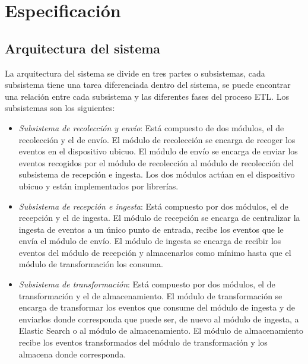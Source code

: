 \chapter{Especificación}

\section{Arquitectura del sistema}
La arquitectura del sistema se divide en tres partes o subsistemas, cada subsistema tiene una tarea diferenciada dentro del sistema, se puede encontrar una relación entre cada subsistema y las diferentes fases del proceso ETL. Los subsistemas son los siguientes:

\begin{itemize}
	\item \textit{Subsistema de recolección y envío}: Está compuesto de dos módulos, el de recolección y el de envío. El módulo de recolección se encarga de recoger los eventos en el dispositivo ubicuo. El módulo de envío se encarga de enviar los eventos recogidos por el módulo de recolección al módulo de recolección del subsistema de recepción e ingesta. Los dos módulos actúan en el dispositivo ubicuo y están implementados por librerías.
	
	\item \textit{Subsistema de recepción e ingesta}: Está compuesto por dos módulos, el de recepción y el de ingesta. El módulo de recepción se encarga de centralizar la ingesta de eventos a un único punto de entrada, recibe los eventos que le envía el módulo de envío. El módulo de ingesta se encarga de recibir los eventos del módulo de recepción y almacenarlos como mínimo hasta que el módulo de transformación los consuma.

	\item  \textit{Subsistema de transformación}:  Está compuesto por dos módulos, el de transformación y el de almacenamiento. El módulo de transformación se encarga de transformar los eventos que consume del módulo de ingesta y de enviarlos donde corresponda que puede ser, de nuevo al módulo de ingesta, a Elastic Search o al módulo de almacenamiento. El módulo de almacenamiento recibe los eventos transformados del módulo de transformación y los almacena donde corresponda.
\end{itemize}
